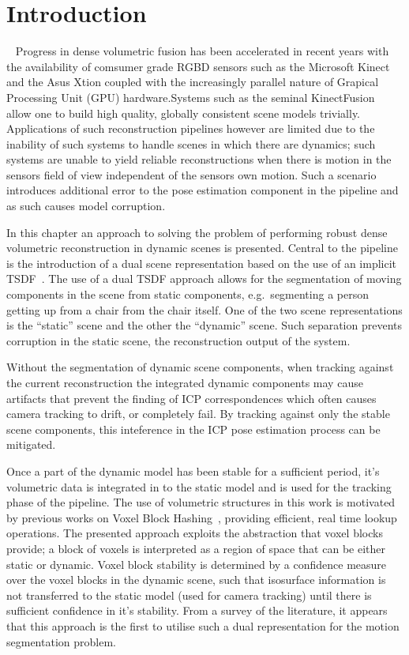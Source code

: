 \section{Introduction}
~\label{sec:moseg_introduction}
Progress in dense volumetric fusion has been accelerated in recent years with
the availability of comsumer grade RGBD sensors such as the Microsoft Kinect and
the Asus Xtion coupled with the increasingly parallel nature of Grapical Processing 
Unit (GPU) hardware.Systems such as the seminal KinectFusion~\cite{Newcombe2011} 
allow one to build high quality, globally consistent scene models trivially. 
Applications of such reconstruction pipelines however are limited due to the 
inability of such systems to handle scenes in which there are dynamics; such 
systems are unable to yield reliable reconstructions when there is motion in the 
sensors field of view independent of the sensors own motion. Such a scenario introduces
additional error to the pose estimation component in the pipeline and as such
causes model corruption.

In this chapter an approach to solving the problem of performing robust
dense volumetric reconstruction in dynamic scenes is presented. Central to the
pipeline is the introduction of a dual scene representation based on the use
of an implicit TSDF~\cite{Curless1996}. The use of a dual TSDF approach allows
for the segmentation of moving components in the scene from static components,
e.g.\ segmenting a person getting up from a chair from the chair itself. One of
the two scene representations is the ``static'' scene and the other the
``dynamic'' scene. Such separation prevents corruption in the static scene,
the reconstruction output of the system.

Without the segmentation of dynamic scene components, when tracking against the
current reconstruction the integrated dynamic components may cause artifacts
that prevent the finding of ICP correspondences which often causes camera
tracking to drift, or completely fail. By tracking against only the stable
scene components, this inteference in the ICP pose estimation process can be
mitigated.

Once a part of the dynamic model has been stable for a sufficient period, it's
volumetric data is integrated in to the static model and is used for the
tracking phase of the pipeline. The use of volumetric structures in this work
is motivated by previous works on Voxel Block Hashing~\cite{NieBner2013},
providing efficient, real time lookup operations. The presented approach
exploits the abstraction that voxel blocks provide; a block of voxels is
interpreted as a region of space that can be either static or dynamic.
Voxel block stability is determined by a confidence measure over the voxel
blocks in the dynamic scene, such that isosurface information is not transferred
to the static model (used for camera tracking) until there is sufficient
confidence in it's stability. From a survey of the literature, it appears that 
this approach is the first to utilise such a dual representation for the motion 
segmentation problem.

